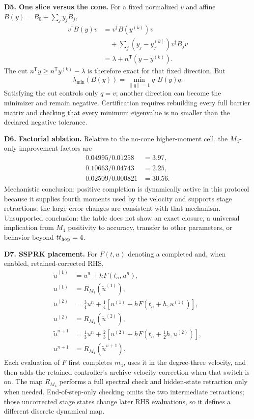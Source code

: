 \documentclass[10pt,letterpaper,twocolumn]{article}
\begin{document}
\textbf{D5. One slice versus the cone.}
For a fixed normalized \(v\) and affine
\(B(y)=B_0+\sum_jy_jB_j\),
\[
\begin{aligned}
v^\dagger B(y)v
&=v^\dagger B(y^{(k)})v\\
&\quad+\sum_j(y_j-y_j^{(k)})v^\dagger B_jv\\
&=\lambda+n^{\mathsf T}(y-y^{(k)}).
\end{aligned}
\]
The cut \(n^{\mathsf T}y\ge n^{\mathsf T}y^{(k)}-\lambda\) is therefore exact
for that fixed direction.  But
\[
\lambda_{\min}(B(y))=\min_{\|q\|=1}q^\dagger B(y)q.
\]
Satisfying the cut controls only \(q=v\); another direction can become the
minimizer and remain negative.  Certification requires rebuilding every full
barrier matrix and checking that every minimum eigenvalue is no smaller than
the declared negative tolerance.

\textbf{D6. Factorial ablation.}
Relative to the no-cone higher-moment cell, the $M_4$-only improvement factors
are
\[
\begin{aligned}
0.04995/0.01258&=3.97,\\
0.10663/0.04743&=2.25,\\
0.02509/0.000821&=30.56.
\end{aligned}
\]
Mechanistic conclusion: positive completion is dynamically active in this
protocol because it supplies fourth moments used by the velocity and supports
stage retractions; the large error changes are consistent with that mechanism.
Unsupported conclusion: the table does not show an exact closure, a universal
implication from \(M_4\) positivity to accuracy, transfer to other parameters,
or behavior beyond \(t t_{\rm hop}=4\).

\textbf{D7. SSPRK placement.}
For \(F(t,u)\) denoting a completed and, when enabled, retained-corrected RHS,
\[
\begin{aligned}
\widetilde u^{(1)}&=u^n+hF(t_n,u^n),\\
u^{(1)}&=R_{M_4}(\widetilde u^{(1)}),\\
\widetilde u^{(2)}&=\tfrac34u^n+\tfrac14
 [u^{(1)}+hF(t_n+h,u^{(1)})],\\
u^{(2)}&=R_{M_4}(\widetilde u^{(2)}),\\
\widetilde u^{n+1}&=\tfrac13u^n+\tfrac23
 [u^{(2)}+hF(t_n+\tfrac12h,u^{(2)})],\\
u^{n+1}&=R_{M_4}(\widetilde u^{n+1}).
\end{aligned}
\]
Each evaluation of \(F\) first completes \(m_4\), uses it in the degree-three
velocity, and then adds the retained controller's archive-velocity correction
when that switch is on.  The map \(R_{M_4}\) performs a full spectral check and
hidden-state retraction only when needed.  End-of-step-only checking omits the
two intermediate retractions; those uncorrected stage states change later RHS
evaluations, so it defines a different discrete dynamical map.
\end{document}
